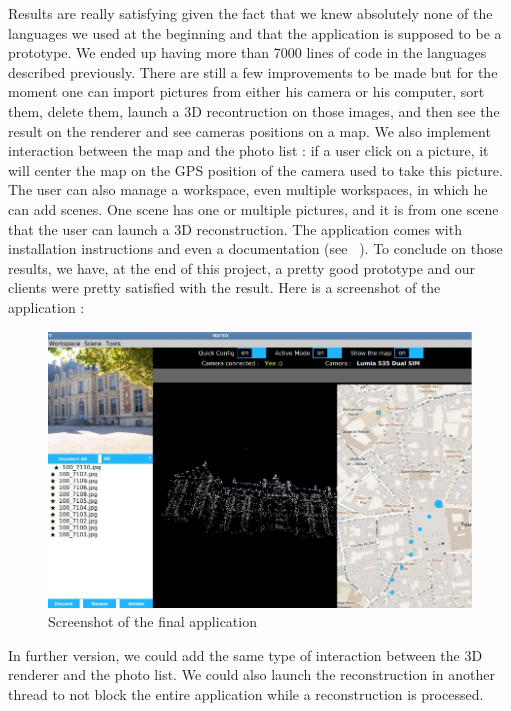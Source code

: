 Results are really satisfying given the fact that we knew absolutely none of the languages we used at the beginning and that the application is supposed to be a prototype. We ended up having more than 7000
lines of code in the languages described previously. There are still a few improvements to be made 
but for the moment one can import pictures from either his camera or his computer, sort them, delete them, launch a 3D recontruction on those images, and then see the result on the renderer and see cameras positions on a map.
We also implement interaction between the map and the photo list : if a user click on a picture, it will center the map on the GPS position of the camera used to take this picture. The user can also manage a workspace, even multiple workspaces, in which he can add scenes. One scene has one or multiple pictures, and it is from one scene that the user can launch a 3D reconstruction. The application comes with installation instructions and even a documentation (see ~\cite{doc}). To conclude on those results, we have, at the end of this project, a pretty good prototype and our clients were pretty satisfied with the result. Here is a screenshot of the application :
\begin{figure}[t]
\includegraphics[width=\linewidth]{images/app.png}
\caption{Screenshot of the final application}
\label{app}
\vspace{-2mm}
\end{figure}

In further version, we could add the same type of interaction between the 3D renderer and the photo list. We could also launch the reconstruction in another thread to not block the entire application while a reconstruction is processed.